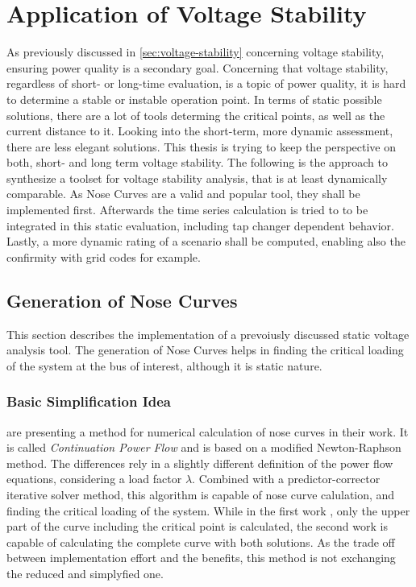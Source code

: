 \section{Application of Voltage Stability}
\label{sec:application-voltage-stability}

As previously discussed in \autoref{sec:voltage-stability} concerning voltage stability, ensuring power quality is a secondary goal.
Concerning that voltage stability, regardless of short- or long-time evaluation, is a topic of power quality, it is hard to determine a stable or instable operation point.
In terms of static possible solutions, there are a lot of tools determing the critical points, as well as the current distance to it.
Looking into the short-term, more dynamic assessment, there are less elegant solutions. 
This thesis is trying to keep the perspective on both, short- and long term voltage stability.
The following is the approach to synthesize a toolset for voltage stability analysis, that is at least dynamically comparable.
As Nose Curves are a valid and popular tool, they shall be implemented first. 
Afterwards the time series calculation is tried to to be integrated in this static evaluation, including tap changer dependent behavior.
Lastly, a more dynamic rating of a scenario shall be computed, enabling also the confirmity with grid codes for example.

\subsection{Generation of Nose Curves}
\label{sec:nose-curves}

This section describes the implementation of a prevoiusly discussed static voltage analysis tool.
The generation of Nose Curves helps in finding the critical loading of the system at the bus of interest, although it is static nature. 

\subsubsection{Basic Simplification Idea}

\textcite{ajjarapu_1992, ajjarapu_2007} are presenting a method for numerical calculation of nose curves in their work. 
It is called {\itshape Continuation Power Flow} and is based on a modified Newton-Raphson method.
The differences rely in a slightly different definition of the power flow equations, considering a load factor $\lambda$.
Combined with a predictor-corrector iterative solver method, this algorithm is capable of nose curve calulation, and finding the critical loading of the system.
While in the first work \autocite{ajjarapu_1992}, only the upper part of the curve including the critical point is calculated, the second work \autocite{ajjarapu_2007} is capable of calculating the complete curve with both solutions. 
As the trade off between implementation effort and the benefits, this method is not exchanging the reduced and simplyfied one.


